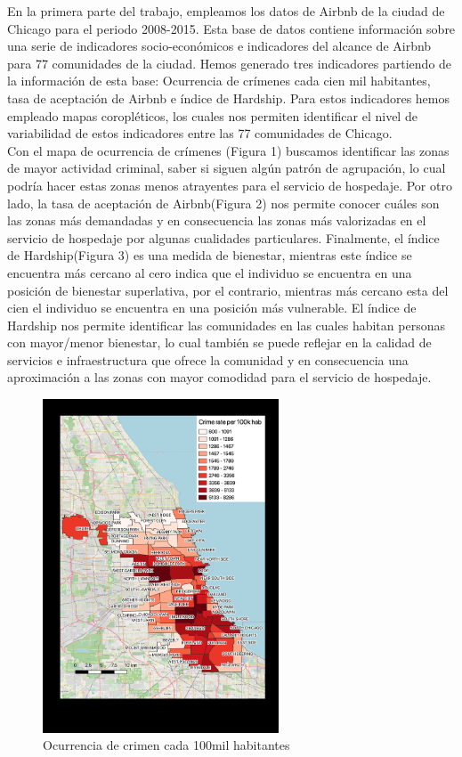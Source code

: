\documentclass[11pt,a4paper]{article}
\begin{document}
En la primera parte del trabajo, empleamos los datos de Airbnb de la ciudad de Chicago para el periodo 2008-2015. Esta base de datos contiene información sobre una serie de indicadores socio-económicos e indicadores del alcance de Airbnb para 77 comunidades de la ciudad. Hemos generado tres indicadores partiendo de la información de esta base: Ocurrencia de crímenes cada cien mil habitantes, tasa de aceptación de Airbnb e índice de Hardship. Para estos indicadores hemos empleado mapas coropléticos, los cuales nos permiten identificar el nivel de variabilidad de estos indicadores entre las 77 comunidades de Chicago.
\\ 
Con el mapa de ocurrencia de crímenes (Figura 1) buscamos identificar las zonas de mayor actividad criminal, saber si siguen algún patrón de agrupación, lo cual podría hacer estas zonas menos atrayentes para el servicio de hospedaje. Por otro lado, la tasa de aceptación de Airbnb(Figura 2) nos permite conocer cuáles son las zonas más demandadas y en consecuencia las zonas más valorizadas en el servicio de hospedaje por algunas cualidades particulares. Finalmente, el índice de Hardship(Figura 3) es una medida de bienestar, mientras este índice se encuentra más cercano al cero indica que el individuo se encuentra en una posición de bienestar superlativa, por el contrario, mientras más cercano esta del cien el individuo se encuentra en una posición más vulnerable. El índice de Hardship nos permite identificar las comunidades en las cuales habitan personas con mayor/menor bienestar, lo cual también se puede reflejar en la calidad de servicios e infraestructura que ofrece la comunidad y en consecuencia una aproximación a las zonas con mayor comodidad para el servicio de hospedaje. 

\begin{figure}[!h]
    \centering
    \includegraphics[width=7cm]{Crime-rate.png}
   \caption{Ocurrencia de crimen cada 100mil habitantes}
    \label{fig:my_label}
\end{figure}
\end{document}
